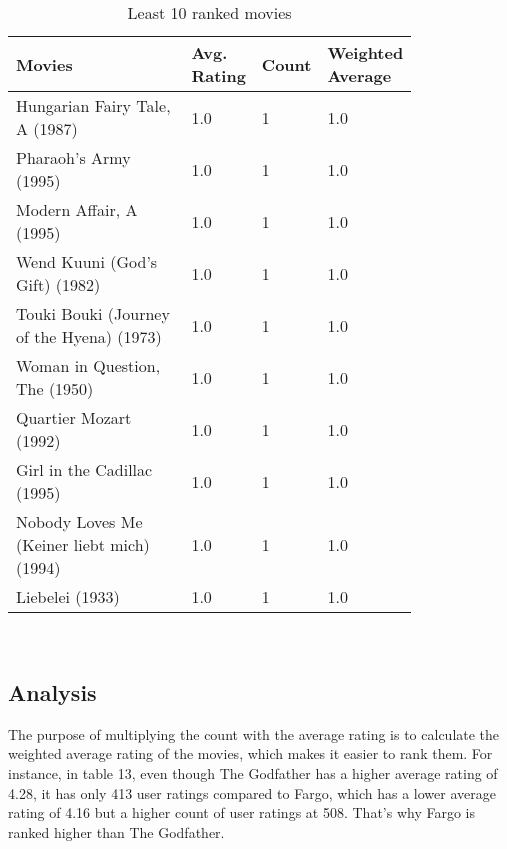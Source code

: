 \documentclass[12pt]{article}
\begin{document}
\begin{table}[h]
\centering
\caption{Least 10 ranked movies}
\label{tbl:simple}
\begin{tabular}{p{0.50\linewidth}p{0.10\linewidth}p{0.10\linewidth}p{0.10\linewidth}}
\hline
\textbf{Movies} & \textbf{Avg. Rating} & \textbf{Count} & \textbf{Weighted Average} \\ \hline \hline
              Hungarian Fairy Tale, A (1987)&            1.0&            1&             1.0 \\ \hline
                      Pharaoh's Army (1995) &           1.0 &           1 &            1.0  \\ \hline
                    Modern Affair, A (1995) &           1.0 &           1 &            1.0  \\ \hline
             Wend Kuuni (God's Gift) (1982) &           1.0 &           1 &            1.0  \\ \hline
  Touki Bouki (Journey of the Hyena) (1973) &           1.0 &           1 &            1.0  \\ \hline
              Woman in Question, The (1950) &           1.0 &           1 &            1.0  \\ \hline
                     Quartier Mozart (1992) &           1.0 &           1 &            1.0  \\ \hline
                Girl in the Cadillac (1995) &           1.0 &           1 &            1.0  \\ \hline
 Nobody Loves Me (Keiner liebt mich) (1994) &           1.0 &           1 &            1.0  \\ \hline
                            Liebelei (1933) &           1.0 &           1 &            1.0  \\ \hline\hline
\end{tabular}
\end{table}
\\

\subsection*{Analysis}
The purpose of multiplying the count with the average rating is to calculate the weighted average rating of the movies, which makes it easier to rank them. For instance, in table 13, even though The Godfather has a higher average rating of 4.28, it has only 413 user ratings compared to Fargo, which has a lower average rating of 4.16 but a higher count of user ratings at 508. That's why Fargo is ranked higher than The Godfather.
\end{document}
